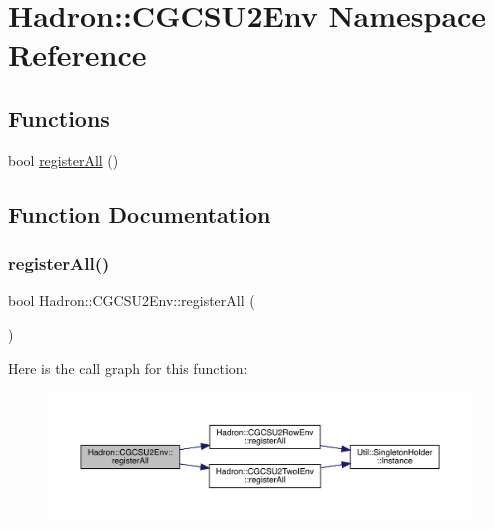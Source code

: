 \hypertarget{namespaceHadron_1_1CGCSU2Env}{}\section{Hadron\+:\+:C\+G\+C\+S\+U2\+Env Namespace Reference}
\label{namespaceHadron_1_1CGCSU2Env}
\subsection*{Functions}
\begin{DoxyCompactItemize}
\item 
bool \mbox{\hyperlink{namespaceHadron_1_1CGCSU2Env_abd79304b8b72ab5ae3e0ede4ecd647a5}{register\+All}} ()
\end{DoxyCompactItemize}


\subsection{Function Documentation}
\mbox{\label{namespaceHadron_1_1CGCSU2Env_abd79304b8b72ab5ae3e0ede4ecd647a5}} 
\subsubsection{\texorpdfstring{registerAll()}{registerAll()}}
{\footnotesize\ttfamily bool Hadron\+::\+C\+G\+C\+S\+U2\+Env\+::register\+All (\begin{DoxyParamCaption}{ }\end{DoxyParamCaption})}

Here is the call graph for this function\+:\nopagebreak
\begin{figure}[H]
\begin{center}
\leavevmode
\includegraphics[width=350pt]{d0/d8c/namespaceHadron_1_1CGCSU2Env_abd79304b8b72ab5ae3e0ede4ecd647a5_cgraph}
\end{center}
\end{figure}
